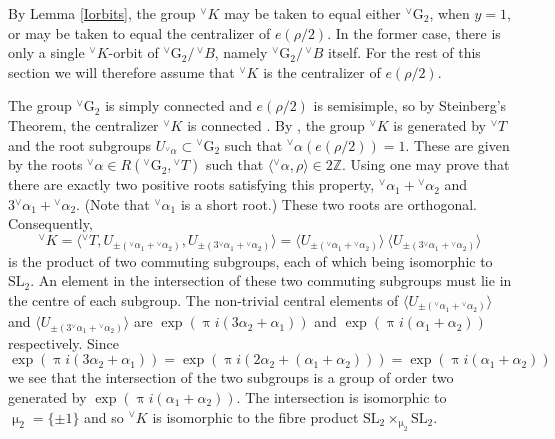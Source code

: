 \documentclass[a4paper, 11pt]{article}
\begin{document}
 By Lemma
\ref{Iorbits}, the group ${^\vee}K$ may be taken to equal either
${^\vee}\mathrm{G}_{2}$, when $y=1$, or may be taken to equal the
centralizer of $e(\rho/2)$.  In the former case, there is only a
single ${^\vee}K$-orbit of ${^\vee}\mathrm{G}_{2}/\, {^\vee}B$,
namely  ${^\vee}\mathrm{G}_{2}/\, {^\vee}B$ itself.  For the rest of
this section we will therefore assume that ${^\vee}K$ is the
centralizer of $e(\rho/2)$.  

The group ${^\vee}\mathrm{G}_{2}$ is simply connected and $e(\rho/2)$
is semisimple, so by Steinberg's Theorem, the centralizer ${^\vee}K$
is connected  \cite[Theorem   2.11]{HumphCC}. By \cite[Theorem
  2.2]{HumphCC}, the group ${^\vee}K$ is generated by ${^\vee}T$ and the root
subgroups $U_{{^\vee}\alpha} \subset {^\vee}\mathrm{G}_{2}$ such that
${^\vee}\alpha(e(\rho/2)) = 1$.  These are given by the roots ${^\vee}\alpha \in
R({^\vee}\mathrm{G}_{2},{^\vee}T)$ such that $\langle {^\vee}\alpha,\rho \rangle
\in 2 \mathbb{Z}$.  Using \cite[Lemma 13.3.A]{Humphreys} one may prove
that there are exactly two positive roots satisfying this property,
${^\vee}\alpha_{1}+ {^\vee}\alpha_{2}$ and $3 {^\vee}\alpha_{1}+
{^\vee}\alpha_{2}$.  (Note that ${^\vee}\alpha_{1}$ is a short root.) These two 
roots are orthogonal.  Consequently, 
\begin{equation}
\label{checkK}
{^\vee}K = \langle {^\vee}T, U_{\pm ({^\vee}\alpha_{1}+
 {^\vee}\alpha_{2})},  U_{\pm (3{^\vee}\alpha_{1}+ {^\vee}\alpha_{2})}
\rangle 
=\langle  U_{\pm ({^\vee}\alpha_{1}+
 {^\vee}\alpha_{2})} \rangle \ \langle U_{\pm (3{^\vee}\alpha_{1}+
  {^\vee}\alpha_{2})} \rangle  
\end{equation}
is the product of two commuting subgroups, each of which being
isomorphic to $\mathrm{SL}_{2}$.  An element in the intersection of
these two commuting subgroups must  lie in the centre of each
subgroup.  The non-trivial central elements of $\langle  U_{\pm
  ({^\vee}\alpha_{1}+ 
 {^\vee}\alpha_{2})} \rangle$ and $\langle U_{\pm
  (3{^\vee}\alpha_{1}+    {^\vee}\alpha_{2})} \rangle$ are $\exp(\uppi
i (3\alpha_{2} +  \alpha_{1}))$ and  $\exp(\uppi i
(\alpha_{1} + \alpha_{2}))$ respectively. 
 Since
$$\exp(\uppi i (3\alpha_{2} +  \alpha_{1}))  = \exp( \uppi i
(2\alpha_{2} + (\alpha_{1}+ \alpha_{2}))) = \exp(\uppi i
(\alpha_{1} + \alpha_{2}))$$
we see that the intersection of the two subgroups is a group of order
two  generated by $\exp(\uppi i
(\alpha_{1} + \alpha_{2}))$.
The intersection is isomorphic to $\upmu_{2} =
\{\pm 1 \}$ and so ${^\vee}K$  is isomorphic to the fibre
product $\mathrm{SL}_{2} \times_{\upmu_{2}} \mathrm{SL}_{2}.$ 
\end{document}
